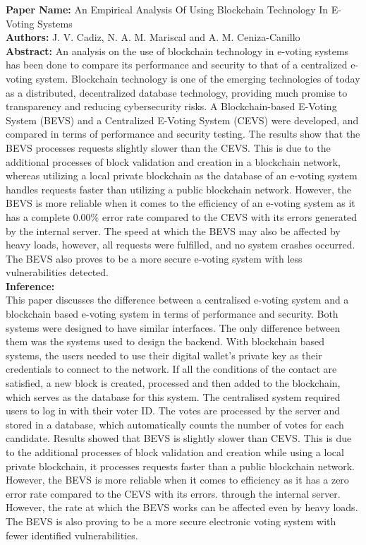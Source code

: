 \documentclass[oneside, 12pt]{book}
\begin{document}
\begin{enumerate}
					\textbf{Paper Name:} An Empirical Analysis Of Using Blockchain Technology In E-Voting Systems \cite{cadiz2021empirical}\\
					\textbf{Authors:} J. V. Cadiz, N. A. M. Mariscal and A. M. Ceniza-Canillo\\
					\textbf{Abstract:} An analysis on the use of blockchain technology in e-voting systems has been done to compare its performance and security to that of a centralized e-voting system. Blockchain technology is one of the emerging technologies of today as a distributed, decentralized database technology, providing much promise to transparency and reducing cybersecurity risks. A Blockchain-based E-Voting System (BEVS) and a Centralized E-Voting System (CEVS) were developed, and compared in terms of performance and security testing. The results show that the BEVS processes requests slightly slower than the CEVS. This is due to the additional processes of block validation and creation in a blockchain network, whereas utilizing a local private blockchain as the database of an e-voting system handles requests faster than utilizing a public blockchain network. However, the BEVS is more reliable when it comes to the efficiency of an e-voting system as it has a complete 0.00\% error rate compared to the CEVS with its errors generated by the internal server. The speed at which the BEVS may also be affected by heavy loads, however, all requests were fulfilled, and no system crashes occurred. The BEVS also proves to be a more secure e-voting system with less vulnerabilities detected.\\
					\textbf{Inference:}
					\\This paper discusses the difference between a centralised e-voting system and a blockchain based e-voting system in terms of performance and security. Both systems were designed to have similar interfaces. The only difference between them was the systems used to design the backend. With blockchain based systems, the users needed to use their digital wallet's private key as their credentials to connect to the network. If all the conditions of the contact are satisfied, a new block is created, processed and then added to the blockchain, which serves as the database for this system. The centralised system required users to log in with their voter ID. The votes are processed by the server and stored in a database, which automatically counts the number of votes for each candidate.  Results showed that BEVS is slightly slower than CEVS. This is due to the additional processes of block validation and creation while using a local private blockchain, it processes requests faster than a public blockchain network.  However, the BEVS is more reliable when it comes to efficiency as it has a zero error rate compared to the CEVS with its errors. through the internal server. However, the rate at which the BEVS works can be affected even by heavy loads. The BEVS is also proving to be a more secure electronic voting system with fewer identified vulnerabilities.

\end{enumerate}
\end{document}
